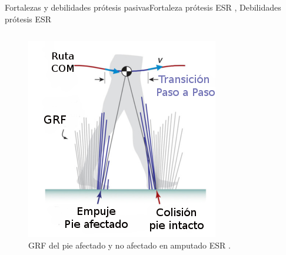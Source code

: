 \documentclass[10pt]{beamer}
\begin{document}
\begin{frame}{Fortalezas y debilidades prótesis pasivas}{Fortaleza prótesis ESR \cite{Zelik2014}, Debilidades prótesis ESR \cite{Varol2010,Weber2014,Au2008,Morgenroth2011,Martinez-Villalpando2009,Esposito2015,DeAsha2014}}
\begin{columns}[t]
\begin{figure}
\begin{centering}
\includegraphics[scale=0.4]{Feathergraphics/colision}
\caption{\footnotesize{GRF del pie afectado y no afectado en amputado ESR \cite{Morgenroth2011}.}}
\end{centering}
\end{figure}

\end{columns}

\end{frame}
\end{document}
